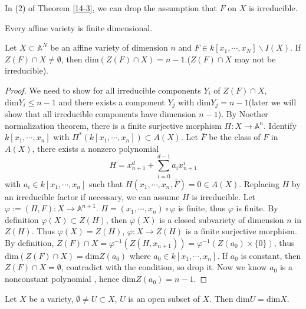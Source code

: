 \begin{remark}
  In (2) of Theorem \ref{14-3}, we can drop the assumption that $F$ on $X$ is irreducible.
\end{remark}
\begin{corollary}
	Every affine variety is finite dimensional.
\end{corollary}
\begin{proposition}\label{15-1}
	Let $ X\subset \mathbb{A}^N $ be an affine variety of dimension $ n $ and $ F\in k[x_1,\cdots,x_N]\backslash I(X) $. If $ Z(F)\cap X\neq \emptyset $, then $ \mathrm{dim}(Z(F)\cap X)=n-1 $.($ Z(F)\cap X $ may not be irreducible).
\end{proposition}
\begin{proof}
	We need to show for all irreducible components $ Y_i $ of $ Z(F)\cap X $, $ \mathrm{dim} Y_i\leq n-1 $ and there exists a component $ Y_j $ with $ \mathrm{dim}Y_j=n-1 $(later we will show that all irreducible components have dimension $ n-1 $). By Noether normalization theorem, there is a finite surjective morphism $ \Pi:X\to \mathbb{A}^n $. Identify $ k[x_1,\cdots,x_n] $ with $ \Pi^\ast(k[x_1,\cdots,x_n])\subset A(X) $. Let $ \bar{F} $ be the class of $ F $ in $ A(X) $, there exists a nonzero polynomial
	$$
		H=x_{n+1}^d + \sum\limits_{i=0}^{d-1}a_ix_{n+1}^i
	$$
	with $ a_i\in k[x_1,\cdots,x_n] $ such that $ H(x_1,\cdots,x_n,\bar{F})=0\in A(X) $. Replacing $ H $ by an irreducible  factor if necessary, we can assume $ H $ is  irreducible. Let $ \varphi :=(\Pi,F):X\to \mathbb{A}^{n+1} $. $ \Pi = (x_1,\cdots,x_n)\circ\varphi $ is finite, thus $ \varphi $ is finite. By definition $ \varphi (X)\subset Z(H) $, then $ \varphi(X) $ is a closed subvariety of dimension $ n $ in $ Z(H) $. Thus $ \varphi(X)=Z(H) $, $ \varphi :X\to Z(H) $ is a finite surjective morphism. By definition, $ Z(F)\cap X= \varphi^{-1}(Z(H,x_{n+1}))=\varphi^{-1}(Z(a_0)\times \lbrace 0\rbrace) $, thus $ \mathrm{dim}(Z(F)\cap X)=\mathrm{dim} Z(a_0) $ where $ a_0\in k[x_1,\cdots,x_n] $. If $ a_0 $ is constant, then $ Z(F)\cap X=\emptyset $, contradict with the condition, so drop it. Now we know $ a_0 $ is a nonconstant polynomial , hence $ \mathrm{dim}Z(a_0)=n-1 $.
\end{proof}
\begin{theorem}\label{15-2}
	Let $ X $ be a variety, $ \emptyset\neq U\subset X $, $ U $ is an open subset of $ X $. Then $ \mathrm{dim}U=\mathrm{dim}X $.
\end{theorem}
